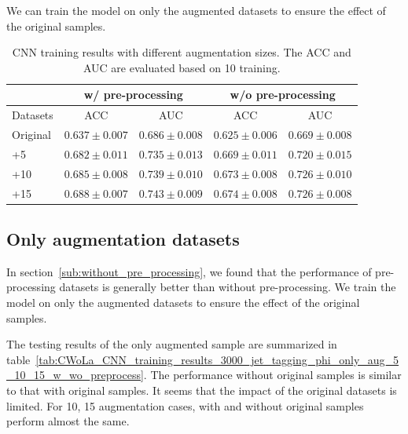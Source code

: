 \documentclass[12pt]{article}
\begin{document}
        We can train the model on only the augmented datasets to ensure the effect of the original samples.
        \begin{table}[htpb]
            \centering
            \caption{CNN training results with different augmentation sizes. The ACC and AUC are evaluated based on 10 training.}
            \label{tab:CWoLa_CNN_training_results_3000_jet_tagging_phi_aug_5_10_15_w_wo_preprocess}
            \begin{tabular}{l|cc|cc}
                         & \multicolumn{2}{c|}{w/ pre-processing}      & \multicolumn{2}{c}{w/o pre-processing}           \\ \hline
                Datasets & ACC               & AUC               & ACC               & AUC               \\ \hline
                Original & $0.637 \pm 0.007$ & $0.686 \pm 0.008$ & $0.625 \pm 0.006$ & $0.669 \pm 0.008$ \\
                +5       & $0.682 \pm 0.011$ & $0.735 \pm 0.013$ & $0.669 \pm 0.011$ & $0.720 \pm 0.015$ \\
                +10      & $0.685 \pm 0.008$ & $0.739 \pm 0.010$ & $0.673 \pm 0.008$ & $0.726 \pm 0.010$ \\
                +15      & $0.688 \pm 0.007$ & $0.743 \pm 0.009$ & $0.674 \pm 0.008$ & $0.726 \pm 0.008$
            \end{tabular}
        \end{table}
    \subsection{Only augmentation datasets}%
    \label{sub:only_augmentation_datasets}
        In section~\ref{sub:without_pre_processing}, we found that the performance of pre-processing datasets is generally better than without pre-processing. We train the model on only the augmented datasets to ensure the effect of the original samples.

        The testing results of the only augmented sample are summarized in table~\ref{tab:CWoLa_CNN_training_results_3000_jet_tagging_phi_only_aug_5_10_15_w_wo_preprocess}. The performance without original samples is similar to that with original samples. It seems that the impact of the original datasets is limited. For 10, 15 augmentation cases, with and without original samples perform almost the same. 
\end{document}
